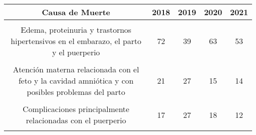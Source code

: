 \begin{tabular}[t]{ccccc}
\toprule
\textbf{Causa de Muerte} & \textbf{2018} & \textbf{2019} & \textbf{2020} & \textbf{2021}\\
\midrule
\cellcolor[HTML]{B6B3FF}{Embarazo terminado en aborto} & \cellcolor[HTML]{B6B3FF}{19} & \cellcolor[HTML]{B6B3FF}{23} & \cellcolor[HTML]{B6B3FF}{10} & \cellcolor[HTML]{B6B3FF}{14}\\
Edema, proteinuria y trastornos hipertensivos en el embarazo, el parto y el puerperio & 72 & 39 & 63 & 53\\
\cellcolor[HTML]{B6B3FF}{Otros trastornos maternos relacionados principalmente con el embarazo} & \cellcolor[HTML]{B6B3FF}{8} & \cellcolor[HTML]{B6B3FF}{6} & \cellcolor[HTML]{B6B3FF}{12} & \cellcolor[HTML]{B6B3FF}{9}\\
Atención materna relacionada con el feto y la cavidad amniótica y con posibles problemas del parto & 21 & 27 & 15 & 14\\
\cellcolor[HTML]{B6B3FF}{Complicaciones del trabajo de parto y del parto} & \cellcolor[HTML]{B6B3FF}{117} & \cellcolor[HTML]{B6B3FF}{103} & \cellcolor[HTML]{B6B3FF}{101} & \cellcolor[HTML]{B6B3FF}{83}\\
Complicaciones principalmente relacionadas con el puerperio & 17 & 27 & 18 & 12\\
\cellcolor[HTML]{B6B3FF}{Otras afecciones obstétricas no clasificadas en otra parte} & \cellcolor[HTML]{B6B3FF}{38} & \cellcolor[HTML]{B6B3FF}{21} & \cellcolor[HTML]{B6B3FF}{40} & \cellcolor[HTML]{B6B3FF}{105}\\
\bottomrule
\end{tabular}

